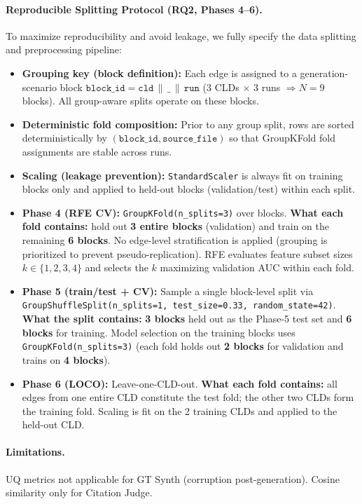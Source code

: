 \paragraph{Reproducible Splitting Protocol (RQ2, Phases 4--6).}
To maximize reproducibility and avoid leakage, we fully specify the data splitting and preprocessing pipeline:
\begin{itemize}[noitemsep]
    \item \textbf{Grouping key (block definition):} Each edge is assigned to a generation-scenario block $\texttt{block\_id}=\texttt{cld}\,\|\,\texttt{\_}\,\|\,\texttt{run}$ (3 CLDs $\times$ 3 runs $\Rightarrow N=9$ blocks). All group-aware splits operate on these blocks.
    \item \textbf{Deterministic fold composition:} Prior to any group split, rows are sorted deterministically by $(\texttt{block\_id}, \texttt{source\_file})$ so that GroupKFold fold assignments are stable across runs.
    \item \textbf{Scaling (leakage prevention):} \texttt{StandardScaler} is always fit on training blocks only and applied to held-out blocks (validation/test) within each split.
    \item \textbf{Phase 4 (RFE CV):} \texttt{GroupKFold(n\_splits=3)} over blocks. \textbf{What each fold contains:} hold out \textbf{3 entire blocks} (validation) and train on the remaining \textbf{6 blocks}. No edge-level stratification is applied (grouping is prioritized to prevent pseudo-replication). RFE evaluates feature subset sizes \(k \in \{1,2,3,4\}\) and selects the \(k\) maximizing validation AUC within each fold.
    \item \textbf{Phase 5 (train/test + CV):} Sample a single block-level split via \texttt{GroupShuffleSplit(n\_splits=1, test\_size=0.33, random\_state=42)}. \textbf{What the split contains:} \textbf{3 blocks} held out as the Phase-5 test set and \textbf{6 blocks} for training. Model selection on the training blocks uses \texttt{GroupKFold(n\_splits=3)} (each fold holds out \textbf{2 blocks} for validation and trains on \textbf{4 blocks}).
    \item \textbf{Phase 6 (LOCO):} Leave-one-CLD-out. \textbf{What each fold contains:} all edges from one entire CLD constitute the test fold; the other two CLDs form the training fold. Scaling is fit on the 2 training CLDs and applied to the held-out CLD.
\end{itemize}

\paragraph{Limitations.}
UQ metrics not applicable for GT Synth (corruption post-generation). Cosine similarity only for Citation Judge.

